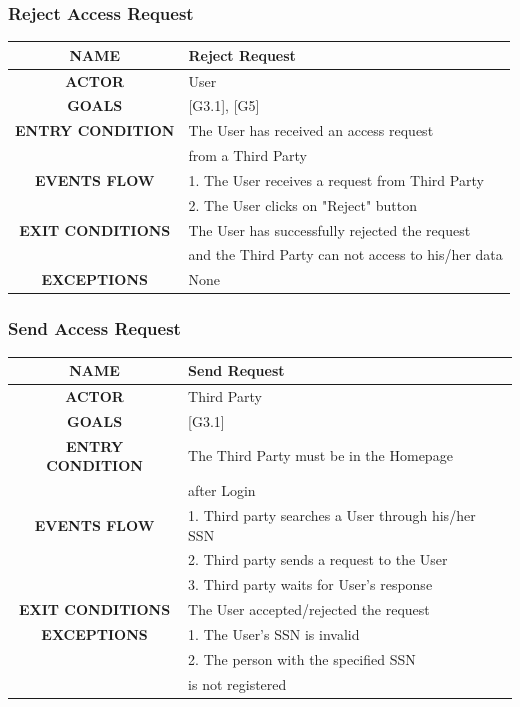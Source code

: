 \documentclass[12pt,a4paper]{article}
\begin{document}
		\subsubsection{Reject Access Request}
		\begin{center}
			\begin{tabular}{| c | l |}
				\hline
				\textbf{NAME} & Reject Request \\
				\hline
				\textbf{ACTOR} & User \\
				\hline
				\textbf{GOALS} & [G3.1], [G5] \\
				\hline
				\textbf{ENTRY CONDITION} & The User has received an access request\\
				& from a Third Party\\ 
				\hline
				\textbf{EVENTS FLOW}  &
				1. The User receives a request from Third Party\\
				&2. The User clicks on "Reject" button\\
				\hline
				\textbf{EXIT CONDITIONS}  & The User has successfully rejected the request\\ 
				& and the Third Party can not access to his/her data\\
				\hline
				\textbf{EXCEPTIONS} &
				None\\
				\hline
			\end{tabular}
		\end{center}
		
		\newpage
		\subsubsection{Send Access Request}
		\begin{center}
			\begin{tabular}{| c | l |}
				\hline
				\textbf{NAME} & Send Request \\
				\hline
				\textbf{ACTOR} & Third Party \\
				\hline
				\textbf{GOALS} & [G3.1] \\
				\hline
				\textbf{ENTRY CONDITION} & The Third Party must be in the Homepage\\ 
				& after Login\\ 
				\hline
				\textbf{EVENTS FLOW}  &
				1. Third party searches a User through his/her SSN\\
				&2. Third party sends a request to the User\\
				&3. Third party waits for User's response\\
				\hline
				\textbf{EXIT CONDITIONS}  & The User accepted/rejected the request \\ \hline
				\textbf{EXCEPTIONS} &
				1. The User's SSN is invalid\\
				&2. The person with the specified SSN\\
				&is not registered\\
				\hline
			\end{tabular}
		\end{center}
\end{document}
